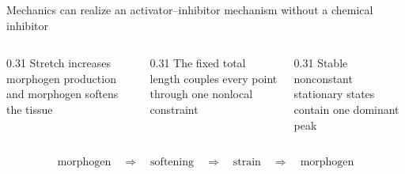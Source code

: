 \begin{frame}{Mechanics can realize an activator--inhibitor mechanism without a chemical inhibitor}
  \hypertarget{comparison}{}
  
  \vspace{-0.08cm}

  \begin{columns}[T,onlytextwidth]
    \begin{column}{0.31\textwidth}
        {Stretch increases morphogen production and morphogen softens the tissue}
    \end{column}
    \begin{column}{0.31\textwidth}
        {The fixed total length couples every point through one nonlocal constraint}
    \end{column}
    \begin{column}{0.31\textwidth}
        {Stable nonconstant stationary states contain one dominant peak}
    \end{column}
  \end{columns}

  \vspace{0.42cm}

  {\color{HydraWhite}\bfseries\fontsize{12.2}{15.2}\selectfont
  \begin{align*}
    \text{morphogen}
    \quad\Longrightarrow\quad
    \text{softening}
    \quad\Longrightarrow\quad
    \text{strain}
    \quad\Longrightarrow\quad
    \text{morphogen}
  \end{align*}
  }

  \vspace{-0.14cm}


\end{frame}


\PerfectModel


